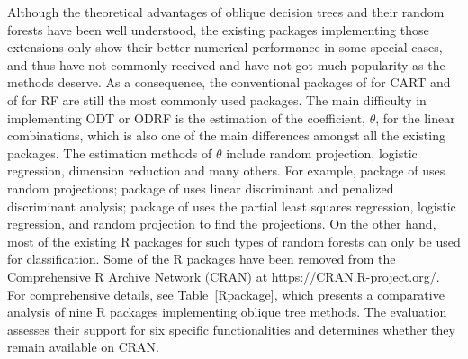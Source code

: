 Although the theoretical advantages of oblique decision trees and their random forests have been well understood, the existing packages implementing those extensions only show their better numerical performance in some special cases, and thus have not commonly received and have not got  much  popularity as the methods deserve. {As a consequence, the conventional packages  \citep{rpart} of \cite{2000Therneau} for CART and  \citep{RF} of \cite{randomForest} for RF are still the most commonly used packages. The main difficulty in implementing {ODT} or {ODRF} is the estimation of the coefficient, $ \theta $, for the linear combinations, which is also one of the main differences amongst all the existing packages. The estimation methods  of $ \theta $ include random projection, logistic regression, dimension reduction and many others. For example, package  \citep{rerf} of \cite{tomita2020sparse} uses random projections; package   \citep{PPforest} of \cite{silva2021projection} uses linear discriminant and penalized discriminant analysis; 
package   \citep{obliqueRF} of \cite{menze2011oblique}  uses
the partial least squares regression,  logistic regression, and random projection   to find the projections.}
On the other hand, most of the existing {R} packages for such types of random forests can only be used for classification. 
Some of the {R} packages have been removed from the Comprehensive {R} Archive Network (CRAN) at \url{https://CRAN.R-project.org/}. {For comprehensive details, see Table~\ref{Rpackage}, which presents a comparative analysis of nine R packages implementing oblique tree methods. The evaluation assesses their support for six specific functionalities and determines whether they remain available on CRAN.}

